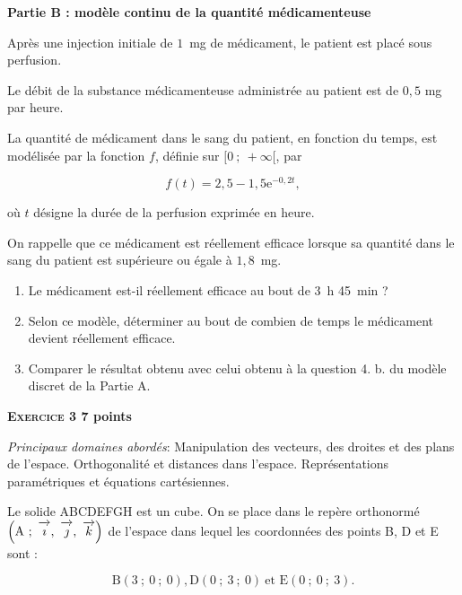 \documentclass[10pt,a4paper]{article}
\newcommand{\vect}[1]{\overrightarrow{\,\mathstrut#1\,}}
\begin{document}
\bigskip

\textbf{Partie B : modèle continu de la quantité médicamenteuse}

\medskip

Après une injection initiale de $1$~mg de médicament, le patient est placé sous perfusion.

Le débit de la substance médicamenteuse administrée au patient est de $0,5$ mg par heure.

La quantité de médicament dans le sang du patient, en fonction du temps, est modélisée
par la fonction $f$, définie sur $[0~;~ +\infty[$, par 

\[f(t) = 2,5 - 1,5\text{e}^{-0,2t},\]

où $t$ désigne la durée de la perfusion exprimée en heure.

On rappelle que ce médicament est réellement efficace lorsque sa quantité dans le sang du patient est supérieure ou égale à $1,8$~mg.

\medskip

\begin{enumerate}
\item Le médicament est-il réellement efficace au bout de 3~h 45~min ?
\item Selon ce modèle, déterminer au bout de combien de temps le médicament devient réellement efficace.
\item Comparer le résultat obtenu avec celui obtenu à la question 4. b. du modèle discret de la Partie A.
\end{enumerate}

\bigskip

\textbf{\textsc{Exercice 3} \hfill 7 points}

\medskip

\emph{Principaux domaines abordés}: Manipulation des vecteurs, des droites et des plans de l'espace. Orthogonalité et distances dans l'espace. Représentations paramétriques et équations cartésiennes.

\bigskip

Le solide ABCDEFGH est un cube. On se place dans le repère orthonormé $\left(\text{A}~;~\vect{\imath},~\vect{\jmath},~\vect{k}\right)$ de l'espace dans lequel les coordonnées des points B, D et E sont : 

\[\text{B}(3~;~0 ~;~0), \text{D} (0~;~3~;~0)\: \text{et E}(0~;~0~;~3).\]
\end{document}
